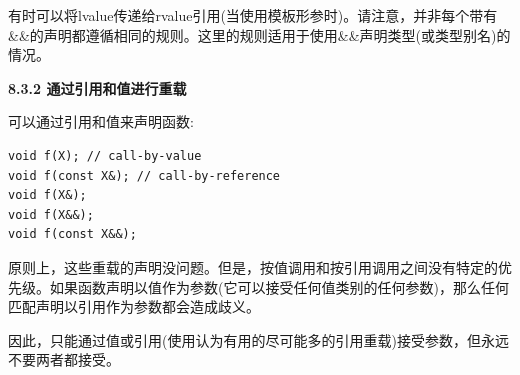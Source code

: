 有时可以将lvalue传递给rvalue引用(当使用模板形参时)。请注意，并非每个带有\&\&的声明都遵循相同的规则。这里的规则适用于使用\&\&声明类型(或类型别名)的情况。\par

\hspace*{\fill} \par %
\textbf{8.3.2 通过引用和值进行重载}

可以通过引用和值来声明函数:\par

\begin{lstlisting}[caption={}]
void f(X); // call-by-value
void f(const X&); // call-by-reference
void f(X&);
void f(X&&);
void f(const X&&);
\end{lstlisting}

原则上，这些重载的声明没问题。但是，按值调用和按引用调用之间没有特定的优先级。如果函数声明以值作为参数(它可以接受任何值类别的任何参数)，那么任何匹配声明以引用作为参数都会造成歧义。\par

因此，只能通过值或引用(使用认为有用的尽可能多的引用重载)接受参数，但永远不要两者都接受。\par


































































